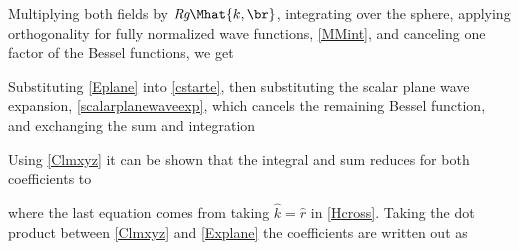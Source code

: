 Multiplying both fields by $\textit{Rg}\Mhat{k,\br}$, integrating over the sphere, applying orthogonality for fully normalized wave functions, \eqref{MMint}, and canceling one factor of the Bessel functions, we get 
%

Substituting \eqref{Eplane} into \eqref{cstarte}, then substituting the scalar plane wave expansion, \eqref{scalarplanewaveexp}, which cancels the remaining Bessel function, and exchanging the sum and integration




Using \eqref{Clmxyz} it can be shown that the integral and sum reduces for both coefficients to  

\noindent where the last equation comes from taking $\hat{k} = \hat{r}$ in \eqref{Hcross}. Taking the dot product between \eqref{Clmxyz} and \eqref{Explane} the coefficients are written out as 

